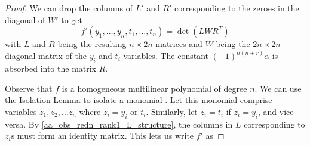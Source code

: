 \documentclass[11pt,letterpaper]{article}
\newtheorem{observation}{Observation}[section]
\begin{document}
{{{\begin{proof}
We can drop the columns of $L'$ and $R'$ corresponding to the zeroes in the diagonal of $W'$ to get \[f'(y_1, \dots, y_n, t_1, \dots, t_n) = \det(LWR^T)\] with $L$ and $R$ being the resulting $n \times 2n$ matrices and $W$ being the $2n \times 2n$ diagonal matrix of the $y_i$ and $t_i$ variables. The constant $(-1)^{n(n+r)}\alpha$ is absorbed into the matrix $R$.


Observe that $f$ is a homogeneous multilinear polynomial of degree $n$. We can use the Isolation Lemma \cite[Section 3]{MVV87} to isolate a monomial \cite[Section 4.1]{NSV94}. Let this monomial comprise variables $z_1, z_2, \dots z_n$ where $z_i = y_i \text{ or } t_i$. Similarly, let $\bar{z}_i = t_i$ if $z_i = y_i$, and vice-versa. By \cref{aa_obs_redn_rank1_L_structure}, the columns in $L$ corresponding to $z_i$s must form an identity matrix. This lets us write $f'$ as


\end{proof}}}}
\end{document}
